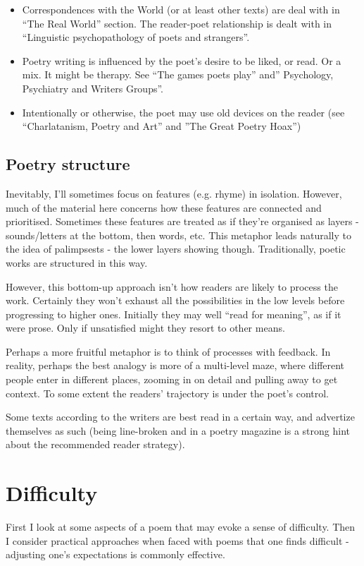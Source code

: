 \documentclass[11pt]{article}
\begin{document}
\begin{itemize}
\item Correspondences with the World (or at least other texts) are deal with in ``The Real World'' section. The reader-poet relationship is dealt with in ``Linguistic psychopathology of poets and strangers''.

\item      Poetry writing is influenced by the poet's desire to be liked, or read. Or a mix. It might be therapy. See ``The games poets play'' and'' Psychology, Psychiatry and Writers Groups''.
\item      Intentionally or otherwise, the poet may use old devices on the reader (see ``Charlatanism, Poetry and Art'' and ''The Great Poetry Hoax'')
\end{itemize}

\subsection*{Poetry structure}

Inevitably, I'll sometimes focus on features (e.g. rhyme) in isolation. However, much of the material here concerns how these features are connected and prioritised. Sometimes these features are treated as if they're organised as layers - sounds/letters at the bottom, then words, etc. This metaphor leads naturally to the idea of palimpsests - the lower layers showing though. Traditionally, poetic works are structured in this way.

However, this bottom-up approach isn't how readers are likely to process the work. Certainly they won't exhaust all the possibilities in the low levels before progressing to higher ones. Initially they may well ``read for meaning'', as if it were prose. Only if unsatisfied might they resort to other means. 

Perhaps a more fruitful metaphor is to think of processes with feedback. In reality, perhaps the best analogy is more of a multi-level maze, where different people enter in different places, zooming in on detail and pulling away to get context. To some extent the readers' trajectory is under the poet's control. 

Some texts according to the writers are best read in a certain way, and advertize themselves as such (being line-broken and in a poetry magazine is a strong hint about the recommended reader strategy).

\section{Difficulty}
First I look at some aspects of a poem that may evoke a sense of difficulty. Then I consider practical approaches when faced with poems that one finds difficult - adjusting one's expectations is commonly effective.
\end{document}
